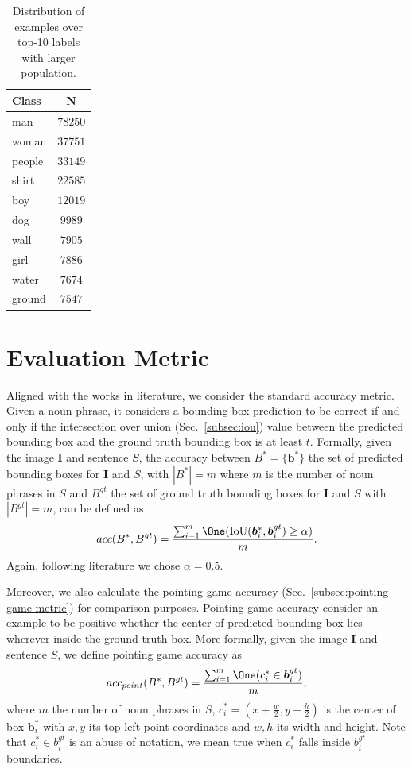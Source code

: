 \begin{table}
  \centering
  \begin{tabular}{lc}
    Class  & N       \\\hline
    man    & $78250$ \\
    woman  & $37751$ \\
    people & $33149$ \\
    shirt  & $22585$ \\
    boy    & $12019$ \\
    dog    & $9989$  \\
    wall   & $7905$  \\
    girl   & $7886$  \\
    water  & $7674$  \\
    ground & $7547$  \\
  \end{tabular}
  \caption{Distribution of examples over top-10 labels with larger population.}
  \label{tab:flickr30k-label-data-top10}
\end{table}

\section{Evaluation Metric}
\label{sec:evaluation-metric}

Aligned with the works in literature, we consider the standard
accuracy metric. Given a noun phrase, it considers a bounding box
prediction to be correct if and only if the intersection over union
(Sec.~\ref{subsec:iou}) value between the predicted bounding box and
the ground truth bounding box is at least $t$. Formally, given the
image $\bm{I}$ and sentence $S$, the accuracy between $B^* = \{
\bm{b}^* \}$ the set of predicted bounding boxes for $\bm{I}$ and $S$,
with $|B^*| = m$ where $m$ is the number of noun phrases in $S$ and
$B^{gt}$ the set of ground truth bounding boxes for $\bm{I}$ and $S$
with $|B^{gt}| = m$, can be defined as
\[
  acc(B^*, B^{gt}) = \frac{\sum_{i = 1}^{m} \One (\iou (\bm{b}_i^*, \bm{b}_i^{gt}) \geq \alpha)}{m}.
\]
Again, following literature we chose $\alpha = 0.5$.

Moreover, we also calculate the pointing game accuracy
(Sec.~\ref{subsec:pointing-game-metric}) for comparison purposes.
Pointing game accuracy consider an example to be positive whether the
center of predicted bounding box lies wherever inside the ground truth
box. More formally, given the image $\bm{I}$ and sentence $S$, we
define pointing game accuracy as 
\[
  acc_{point}(B^*, B^{gt}) = \frac{\sum_{i = 1}^{m} \One (c_i^* \in  \bm{b}_i^{gt})}{m},
\]
where $m$ the number of noun phrases in $S$, $c^*_i = (x +
\frac{w}{2}, y + \frac{h}{2})$ is the center of box $\bm{b}^*_i$ with
$x, y$ its top-left point coordinates and $w, h$ its width and height.
Note that $c^*_i \in b^{gt}_i$ is an abuse of notation, we mean true
when $c^*_i$ falls inside $b^{gt}_i$ boundaries.

